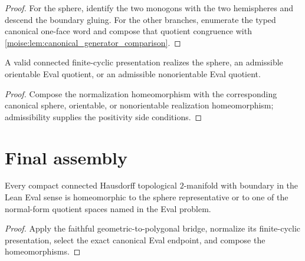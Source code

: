 \begin{proof}
\leanok
For the sphere, identify the two monogons with the two hemispheres and descend
the boundary gluing.  For the other branches, enumerate the typed canonical
one-face word and compose that quotient congruence with
\ref{moise:lem:canonical_generator_comparison}.
\end{proof}

\begin{lemma}
\label{moise:lem:normal_form_witness_eval_branch}
\leanok
{}
A valid connected finite-cyclic presentation realizes the sphere, an
admissible orientable Eval quotient, or an admissible nonorientable Eval
quotient.
\end{lemma}

\begin{proof}
\leanok
Compose the normalization homeomorphism with the corresponding canonical
sphere, orientable, or nonorientable realization homeomorphism; admissibility
supplies the positivity side conditions.
\end{proof}

\section{Final assembly}

\begin{theorem}
\label{moise:thm:eval_classification_of_surfaces}
\leanok
{}
Every compact connected Hausdorff topological $2$-manifold with boundary in the
Lean Eval sense is homeomorphic to the sphere representative or to one of the
normal-form quotient spaces named in the Eval problem.
\end{theorem}

\begin{proof}
\leanok
Apply the faithful geometric-to-polygonal bridge, normalize its finite-cyclic
presentation, select the exact canonical Eval endpoint, and compose the
homeomorphisms.
\end{proof}
